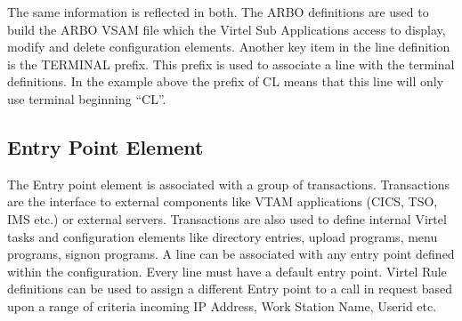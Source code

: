 \documentclass[letterpaper,10pt,english]{sphinxmanual}
\begin{document}
\begin{sphinxVerbatim}[commandchars=\\\{\}]
                                          
                                          
                                         
                
                                            
                                         
                                              
                                                
                                       
                                           
                                               
                                             
                                             
\end{sphinxVerbatim}

\sphinxAtStartPar
The same information is reflected in both. The ARBO definitions are used to build the ARBO VSAM file which the Virtel Sub Applications access to display, modify and delete configuration elements. Another key item in the line definition is the TERMINAL prefix. This prefix is used to associate a line with the terminal definitions. In the example above the prefix of CL means that this line will only use terminal beginning “CL”.


\subsection{Entry Point Element}
\label{\detokenize{connectivity_guide:entry-point-element}}
\sphinxAtStartPar
The Entry point element is associated with a group of transactions. Transactions are the interface to external components like VTAM applications (CICS, TSO, IMS etc.) or external servers. Transactions are also used to define internal Virtel tasks and configuration elements like directory entries, upload programs, menu programs, signon programs. A line can be associated with any entry point defined within the configuration. Every line must have a default entry point. Virtel Rule definitions can be used to assign a different Entry point to a call in request based upon a range of criteria \sphinxhyphen{} incoming IP Address, Work Station Name, Userid etc.
\end{document}
